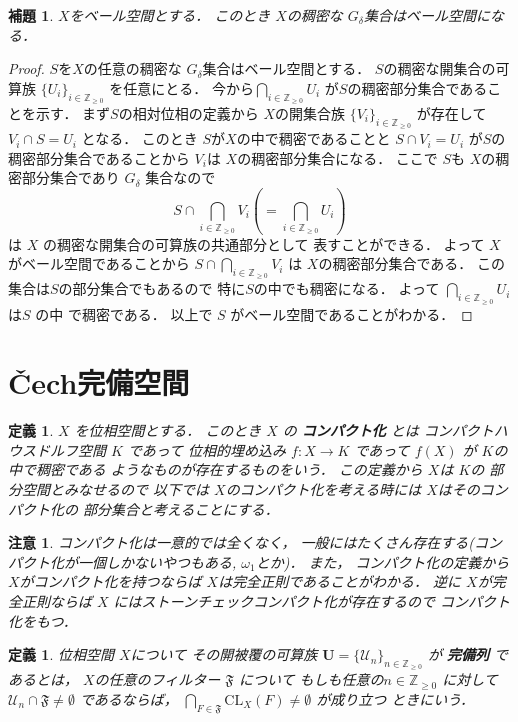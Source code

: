 \documentclass[leqno, a4paper, 12pt]{jsarticle}
\newtheorem{lem}[thm]{補題}
\newtheorem{df}[thm]{定義}
\newtheorem*{rmk}{注意}
\newcommand{\zz}{\mathbb{Z}}
\newcommand{\cl}{\mathrm{CL}}
\begin{document}
\begin{lem}\label{lem:gdelta}
$X$をベール空間とする．
このとき
$X$の稠密な
$G_{\delta}$集合はベール空間になる．
\end{lem}
\begin{proof}
$S$を$X$の任意の稠密な
$G_{\delta}$集合はベール空間とする．
$S$の稠密な開集合の可算族
$\{U_{i}\}_{i\in \zz_{\ge 0}}$
を任意にとる．
今から$\bigcap_{i\in \zz_{\ge 0}}U_{i}$
が$S$の稠密部分集合であることを示す．
まず$S$の相対位相の定義から
$X$の開集合族
$\{V_{i}\}_{i\in \zz_{\ge 0}}$
が存在して
$V_{i}\cap S=U_{i}$
となる．
このとき
$S$が$X$の中で稠密であることと
$S\cap V_{i}=U_{i}$
が$S$の稠密部分集合であることから
$V_{i}$は
$X$の稠密部分集合になる．
ここで
$S$も
$X$の稠密部分集合であり
$G_{\delta}$
集合なので
\[
S\cap \bigcap_{i\in \zz_{\ge 0}}V_{i}\left(=\bigcap_{i\in\zz_{\ge 0}}U_{i}\right)
\]
は
$X$
の稠密な開集合の可算族の共通部分として
表すことができる．
よって
$X$
がベール空間であることから
$S\cap \bigcap_{i\in \zz_{\ge 0}}V_{i}$
は
$X$の稠密部分集合である．
この集合は$S$の部分集合でもあるので
特に$S$の中でも稠密になる．
よって
$\bigcap_{i\in \zz_{\ge 0}}U_{i}$
は$S$
の中
で稠密である．
以上で
$S$
がベール空間であることがわかる．
\end{proof}


\section{\v{C}ech完備空間}

\begin{df}
$X$
を位相空間とする．
このとき
$X$
の
\textbf{コンパクト化}
とは
コンパクトハウスドルフ空間
$K$
であって
位相的埋め込み
$f\colon X\to K$
であって
$f(X)$
が
$K$の中で稠密である
ようなものが存在するものをいう．
この定義から
$X$は
$K$の
部分空間とみなせるので
以下では
$X$のコンパクト化を考える時には
$X$はそのコンパクト化の
部分集合と考えることにする．
\end{df}
\begin{rmk}
コンパクト化は一意的では全くなく，
一般にはたくさん存在する(コンパクト化が一個しかないやつもある, $\omega_{1}$とか)．
また，
コンパクト化の定義から
$X$がコンパクト化を持つならば
$X$は完全正則であることがわかる．
逆に
$X$が完全正則ならば
$X$
にはストーンチェックコンパクト化が存在するので
コンパクト化をもつ．
\end{rmk}

\begin{df}
位相空間
$X$について
その開被覆の可算族
$\mathbf{U}=\{\mathcal{U}_{n}\}_{n\in \zz_{\ge 0}}$
が
\textbf{完備列}
であるとは，
$X$の任意のフィルター
$\mathfrak{F}$
について
もしも任意の$n\in \zz_{\ge 0}$
に対して
$\mathcal{U}_{n}\cap \mathfrak{F}\neq \emptyset$
であるならば，
$\bigcap_{F\in \mathfrak{F}}\cl_{X}(F)\neq \emptyset$
が成り立つ
ときにいう．
\end{df}
\end{document}

